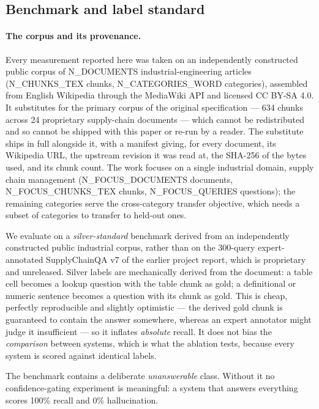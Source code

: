 \documentclass[preprint,3p,times]{elsarticle}
\begin{document}
\subsection{Benchmark and label standard}

\paragraph{The corpus and its provenance.} Every measurement reported here was taken on an independently constructed public corpus of {{N_DOCUMENTS}} industrial-engineering articles ({{N_CHUNKS_TEX}} chunks, {{N_CATEGORIES_WORD}} categories), assembled from English Wikipedia through the MediaWiki API and licensed CC BY-SA 4.0. It substitutes for the primary corpus of the original specification --- 634 chunks across 24 proprietary supply-chain documents --- which cannot be redistributed and so cannot be shipped with this paper or re-run by a reader. The substitute ships in full alongside it, with a manifest giving, for every document, its Wikipedia URL, the upstream revision it was read at, the SHA-256 of the bytes used, and its chunk count. The work focuses on a single industrial domain, supply chain management ({{N_FOCUS_DOCUMENTS}} documents, {{N_FOCUS_CHUNKS_TEX}} chunks, {{N_FOCUS_QUERIES}} questions); the remaining categories serve the cross-category transfer objective, which needs a subset of categories to transfer to held-out ones.


We evaluate on a \emph{silver-standard} benchmark derived from an independently
constructed public industrial corpus, rather than on the 300-query
expert-annotated SupplyChainQA v7 of the earlier project report, which is
proprietary and unreleased. Silver labels are mechanically derived from the
document: a table cell becomes a lookup question with the table chunk as gold;
a definitional or numeric sentence becomes a question with its chunk as gold.
This is cheap, perfectly reproducible and slightly optimistic --- the derived
gold chunk is guaranteed to contain the answer somewhere, whereas an expert
annotator might judge it insufficient --- so it inflates \emph{absolute}
recall. It does not bias the \emph{comparison} between systems, which is what
the ablation tests, because every system is scored against identical labels.

The benchmark contains a deliberate \emph{unanswerable} class. Without it no
confidence-gating experiment is meaningful: a system that answers everything
scores 100\% recall and 0\% hallucination.
\end{document}

